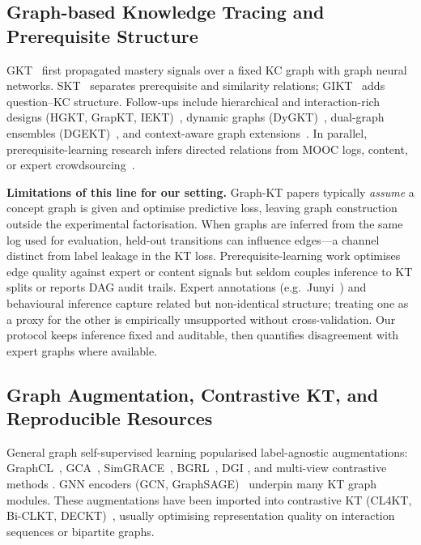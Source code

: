 \documentclass[runningheads]{llncs}
\begin{document}
\subsection{Graph-based Knowledge Tracing and Prerequisite Structure}
\label{sec:related-graphkt}
GKT~\cite{nakagawa2019gkt} first propagated mastery signals over a
fixed KC graph with graph neural networks. SKT~\cite{tong2020skt}
separates prerequisite and similarity relations; GIKT~\cite{yang2021gikt}
adds question--KC structure. Follow-ups include hierarchical and
interaction-rich designs (HGKT, GrapKT, IEKT)~\cite{chen2023hgkt,wang2022grapkt,liu2021iekt}, dynamic graphs (DyGKT)~\cite{dygkt2024},
dual-graph ensembles (DGEKT)~\cite{dgekt2024}, and context-aware graph
extensions~\cite{xiong2023gracekt,huang2022hawkt}. In parallel,
prerequisite-learning research infers directed relations from MOOC logs,
content, or expert crowdsourcing~\cite{lin2016moocprereq,pan2020concept,chen2020dlprereq,laguna2018prereq,bai2025survey,chang2015junyi}.

\textbf{Limitations of this line for our setting.}
Graph-KT papers typically \emph{assume} a concept graph is given and
optimise predictive loss, leaving graph construction outside the
experimental factorisation. When graphs are inferred from the same log
used for evaluation, held-out transitions can influence edges---a
channel distinct from label leakage in the KT loss. Prerequisite-learning
work optimises edge quality against expert or content signals but seldom
couples inference to KT splits or reports DAG audit trails. Expert
annotations (e.g.\ Junyi~\cite{chang2015junyi,junyi_dataset}) and
behavioural inference capture related but non-identical structure; treating
one as a proxy for the other is empirically unsupported without
cross-validation. Our protocol keeps inference fixed and auditable, then
quantifies disagreement with expert graphs where available.

\subsection{Graph Augmentation, Contrastive KT, and Reproducible Resources}
\label{sec:related-aug}
General graph self-supervised learning popularised label-agnostic
augmentations: GraphCL~\cite{you2020graphcl}, GCA~\cite{zhu2021gca},
SimGRACE~\cite{xia2022simgrace}, BGRL~\cite{thakoor2021bgrl}, DGI
\cite{velickovic2018dgi}, and multi-view contrastive methods
\cite{hassani2020mvgrl,zhu2020graphtsa,feng2022graphmvp}. GNN encoders
(GCN, GraphSAGE)~\cite{kipf2017gcn,hamilton2017graphsage} underpin many
KT graph modules. These augmentations have been imported into contrastive
KT (CL4KT, Bi-CLKT, DECKT)~\cite{lee2022cl4kt,song2022biclkt,deckt2025,wan2021contrastive}, usually optimising representation quality on
interaction sequences or bipartite graphs.
\end{document}
